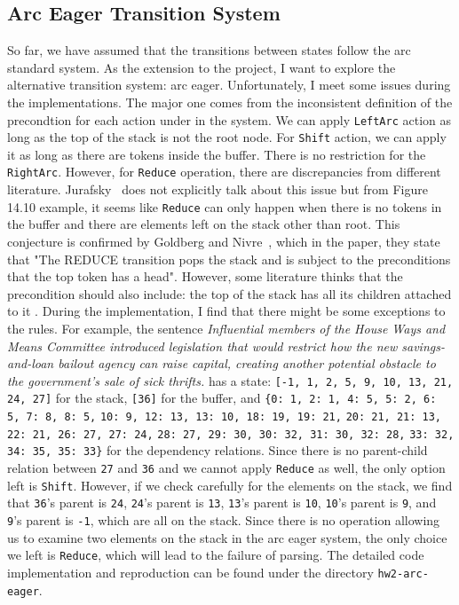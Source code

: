 \documentclass[11pt,a4paper]{article}
\begin{document}
\subsection{Arc Eager Transition System}

So far, we have assumed that the transitions between states follow the arc standard system. As the extension
to the project, I want to explore the alternative transition system: arc eager. Unfortunately, I meet some
issues during the implementations. The major one comes from the inconsistent
definition of the precondtion for each action under in the system. We can apply \verb|LeftArc| action as long as the top
of the stack is not the root node. For \verb|Shift| action, we can apply it as long as there are tokens inside the buffer.
There is no restriction for the \verb|RightArc|. However, for \verb|Reduce| operation, there are
discrepancies from different literature. Jurafsky~ does not explicitly talk about this issue
but from Figure 14.10 example, it seems like \verb|Reduce| can only happen when there is no tokens in the buffer and
there are elements left on the stack other than root. This conjecture is confirmed by Goldberg and Nivre~,
which in the paper, they state that "The REDUCE transition pops the stack and is subject to the preconditions that the top
token has a head". However, some literature thinks that the precondition should also include: the top of the stack has all its
children attached to it \cite{cmuarc}. During the implementation, I find that there might be some exceptions to the rules. For example, 
the sentence \emph{Influential members of the House Ways and Means Committee introduced legislation that would restrict
how the new savings-and-loan bailout agency can raise capital, creating another potential obstacle to the government's sale of sick
thrifts.} has a state: \verb|[-1, 1, 2, 5, 9, 10, 13, 21, 24, 27]| for the stack,
\verb|[36]| for the buffer, and \verb|{0: 1, 2: 1, 4: 5, 5: 2, 6: 5, 7: 8, 8: 5,|
\verb|10: 9, 12: 13, 13: 10, 18: 19, 19: 21,| 
\verb|20: 21, 21: 13, 22: 21, 26: 27, 27: 24,|
\verb|28: 27, 29: 30, 30: 32, 31: 30, 32: 28,|
\verb|33: 32, 34: 35, 35: 33}| for the dependency relations. 
Since there is no parent-child relation between \verb|27| and \verb|36| and we cannot apply \verb|Reduce|
as well, the only option left is \verb|Shift|. However, if we check carefully for the elements on the stack, we find that
\verb|36|'s parent is \verb|24|, \verb|24|'s parent is \verb|13|, \verb|13|'s parent is \verb|10|, \verb|10|'s parent is \verb|9|, and 
\verb|9|'s parent is \verb|-1|, which are all on the stack. Since there is no operation allowing us to examine two elements on the stack in 
the arc eager system, the only choice we left is 
\verb|Reduce|, which will lead to the failure of parsing. The detailed code implementation and reproduction can be found under the directory
\verb|hw2-arc-eager|.
\end{document}
